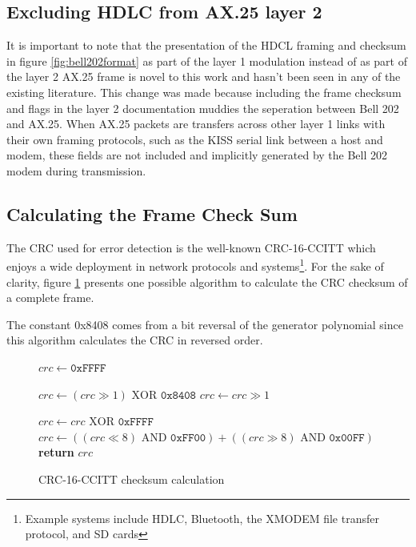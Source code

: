 \documentclass[12pt,letterpaper]{article}
\begin{document}
\subsection{Excluding HDLC from AX.25 layer 2}

It is important to note that the presentation of the HDCL framing
and checksum
in figure \ref{fig:bell202format} as part of the layer 1 modulation 
instead of as part of the layer 2 AX.25 frame is 
novel to this work and hasn't been seen in any of the existing literature.
This change was made because including the frame checksum and flags
in the layer 2 documentation muddies the seperation between Bell 202 
and AX.25. When AX.25 packets are transfers across other layer 1 
links with their own framing protocols, 
such as the KISS serial link between a host and modem,
these fields are not included and implicitly generated by the
Bell 202 modem during transmission. 

\subsection{Calculating the Frame Check Sum}

The CRC used for error detection is the well-known CRC-16-CCITT which
enjoys a wide deployment in network protocols and 
systems\footnote{Example systems include HDLC, Bluetooth, the XMODEM file 
transfer protocol, and SD cards}.
For the sake of clarity, figure \ref{fig:crcccittcode} 
presents one possible algorithm to
calculate the CRC checksum of a complete frame.

The constant 0x8408 comes from a bit reversal of the generator polynomial
since this algorithm calculates the CRC in reversed order.

\begin{figure}
	\begin{algorithmic}[1]
		\State $crc \gets \texttt{0xFFFF}$

		\State $crc \gets (crc \gg 1) \textrm{ XOR } \texttt{0x8408}$
		\Else
			\State $crc \gets crc \gg 1$
		\EndIf
		\EndFor
		\EndFor

		\State $crc \gets crc \textrm{ XOR } \texttt{0xFFFF}$
		\State $crc \gets ((crc \ll 8) \textrm{ AND } \texttt{0xFF00}) + ((crc \gg 8) \textrm{ AND } \texttt{0x00FF})$
		\State \textbf{return} $crc$
		\EndFunction
	\end{algorithmic}

	\caption{CRC-16-CCITT checksum calculation}
	\label{fig:crcccittcode}
\end{figure}
\end{document}
